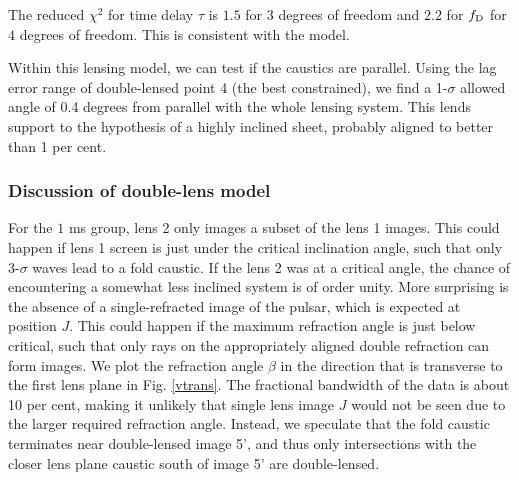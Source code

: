 \documentclass[useAMS,usenatbib]{mn2e}
\begin{document}
The reduced ${\chi}^2$ for time delay $\tau$ is $1.5$
for $3$ degrees of freedom
and $2.2$ for $f_{\rm D}$ for $4$ degrees of freedom.  This is consistent with the model.


Within this lensing model, we can test if the 
caustics are parallel.  Using the lag error range of double-lensed point 4 (the best
constrained), we find a 1-$\sigma$ allowed angle of 0.4 degrees from
parallel with the whole lensing system.  This lends support to the hypothesis of a 
highly inclined sheet, probably aligned to better than 1 per cent.




\subsubsection{Discussion of double-lens model}
\label{subsec:doublelens}
For the $1$ ms group, lens 2
only images a subset of the lens 1 images.  This could happen if
lens 1 screen is just under the critical inclination
angle, such that only 3-$\sigma$ waves lead to a fold caustic.  If the lens 2 was at a critical angle, the chance of encountering a
somewhat less inclined system is of order unity.
More surprising is the absence of a single-refracted
image of the pulsar, which is expected at position $J$.  This could
happen if the maximum refraction angle is just below critical, such
that only rays on the appropriately aligned double refraction can form
images.  
We plot the refraction angle $\beta$ in the
direction that is transverse to the first lens plane in Fig.
\ref{vtrans}.  
The fractional bandwidth of the data is about 10 per cent, making it unlikely that single lens
image $J$ would not be seen due to the larger required refraction
angle.  Instead, we speculate that the fold caustic terminates
near double-lensed image 5', and thus only intersections with the closer
lens plane caustic south of image 5' are double-lensed.
\end{document}
